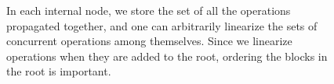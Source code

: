 \documentclass[10pt]{article}
\theoremstyle{definition}
\begin{document}
\begin{figure}[h]
\begin{center}
\caption{\label{fig::set} In each internal node, we store the set of all the operations propagated together, and one can arbitrarily linearize the sets of concurrent operations among themselves. Since we linearize operations when they are added to the root, ordering the blocks in the root is important.}
\end{center}
\end{figure}
\end{document}
